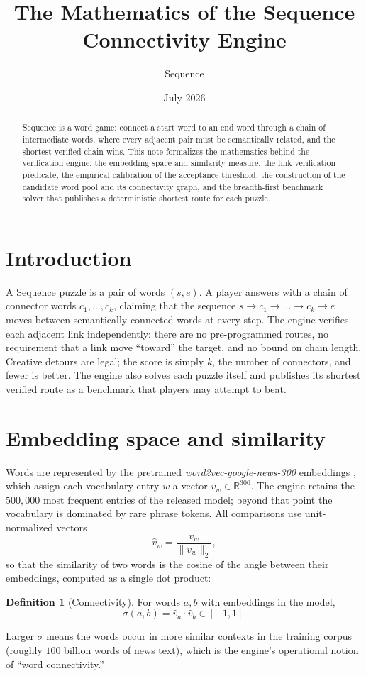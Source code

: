 \documentclass[11pt]{article}
\title{The Mathematics of the Sequence Connectivity Engine}
\author{Sequence}
\date{July 2026}
\theoremstyle{definition}
\newtheorem{definition}{Definition}
\newcommand{\cosim}{\sigma}
\begin{document}
\maketitle

\begin{abstract}
Sequence is a word game: connect a start word to an end word through a chain of
intermediate words, where every adjacent pair must be semantically related, and
the shortest verified chain wins. This note formalizes the mathematics behind
the verification engine: the embedding space and similarity measure, the link
verification predicate, the empirical calibration of the acceptance threshold,
the construction of the candidate word pool and its connectivity graph, and the
breadth-first benchmark solver that publishes a deterministic shortest route
for each puzzle.
\end{abstract}

\section{Introduction}

A Sequence puzzle is a pair of words $(s, e)$. A player answers with a chain of
connector words $c_1, \dots, c_k$, claiming that the sequence
$s \to c_1 \to \dots \to c_k \to e$ moves between semantically connected words
at every step. The engine verifies each adjacent link independently: there are
no pre-programmed routes, no requirement that a link move ``toward'' the
target, and no bound on chain length. Creative detours are legal; the score is
simply $k$, the number of connectors, and fewer is better. The engine also
solves each puzzle itself and publishes its shortest verified route as a
benchmark that players may attempt to beat.

\section{Embedding space and similarity}

Words are represented by the pretrained \emph{word2vec-google-news-300}
embeddings \cite{mikolov2013}, which assign each vocabulary entry $w$ a vector
$v_w \in \mathbb{R}^{300}$. The engine retains the $500{,}000$ most frequent
entries of the released model; beyond that point the vocabulary is dominated by
rare phrase tokens. All comparisons use unit-normalized vectors
\[
  \hat{v}_w = \frac{v_w}{\lVert v_w \rVert_2},
\]
so that the similarity of two words is the cosine of the angle between their
embeddings, computed as a single dot product:
\begin{definition}[Connectivity]
For words $a, b$ with embeddings in the model,
\[
  \cosim(a, b) = \hat{v}_a \cdot \hat{v}_b \in [-1, 1].
\]
\end{definition}
Larger $\cosim$ means the words occur in more similar contexts in the training
corpus (roughly $100$ billion words of news text), which is the engine's
operational notion of ``word connectivity.''
\end{document}
